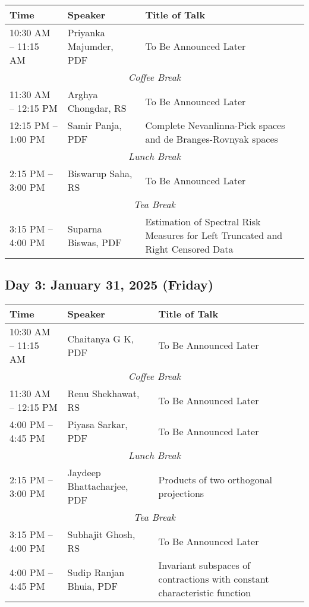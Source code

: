 \noindent
\renewcommand{\arraystretch}{1.5} %
\begin{tabular}{|p{3.5cm}|p{4cm}|p{7cm}|}
	\hline
	\textbf{Time} & \textbf{Speaker} & \textbf{Title of Talk} \\
	\hline
	10:30 AM -- 11:15 AM & Priyanka Majumder, PDF & To Be Announced Later \\
	\hline
	\multicolumn{3}{|c|}{\textit{Coffee Break}} \\
	\hline
	11:30 AM -- 12:15 PM & Arghya Chongdar, RS & To Be Announced Later \\
	\hline
	12:15 PM -- 1:00 PM & Samir Panja, PDF & Complete Nevanlinna-Pick spaces and de Branges-Rovnyak spaces \\
	\hline
	\multicolumn{3}{|c|}{\textit{Lunch Break}} \\
	\hline
	2:15 PM -- 3:00 PM & Biswarup Saha, RS & To Be Announced Later \\
	\hline
	\multicolumn{3}{|c|}{\textit{Tea Break}} \\
	\hline
	3:15 PM -- 4:00 PM & Suparna Biswas, PDF &  Estimation of Spectral Risk Measures for Left Truncated and Right Censored Data  \\
	\hline

\end{tabular}

\subsection*{Day 3: January 31, 2025 (Friday)}

\noindent
\renewcommand{\arraystretch}{1.5} %
\begin{tabular}{|p{3.5cm}|p{4cm}|p{7cm}|}
	\hline
	\textbf{Time} & \textbf{Speaker} & \textbf{Title of Talk} \\
	\hline
	10:30 AM -- 11:15 AM & Chaitanya G K, PDF & To Be Announced Later \\
	\hline
	\multicolumn{3}{|c|}{\textit{Coffee Break}} \\
	\hline
	11:30 AM -- 12:15 PM & Renu Shekhawat, RS & To Be Announced Later \\
	\hline
	4:00 PM -- 4:45 PM & Piyasa Sarkar, PDF & To Be Announced Later \\
	\hline
	\multicolumn{3}{|c|}{\textit{Lunch Break}} \\
	\hline
	2:15 PM -- 3:00 PM & Jaydeep Bhattacharjee, PDF & Products of two orthogonal projections\\
	\hline
	\multicolumn{3}{|c|}{\textit{Tea Break}} \\
	\hline
	3:15 PM -- 4:00 PM & Subhajit Ghosh, RS &  To Be Announced Later \\
	\hline

	4:00 PM -- 4:45 PM & Sudip Ranjan Bhuia, PDF & Invariant subspaces of contractions with constant characteristic function \\
	\hline
\end{tabular}
